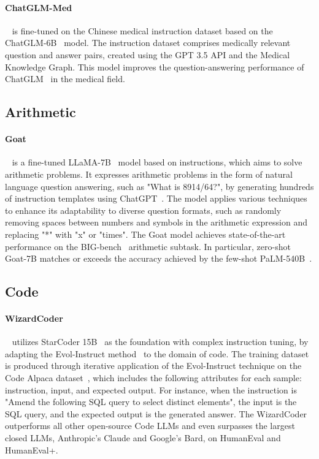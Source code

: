 \documentclass[11pt]{article}
\begin{document}
\paragraph{ChatGLM-Med}~\citep{ChatGLM-Med} is fine-tuned on the Chinese medical instruction dataset based on the ChatGLM-6B~\citep{du2022glm} model. The instruction dataset comprises medically relevant question and answer pairs, created using the GPT 3.5 API and the Medical Knowledge Graph. This model improves the question-answering performance of ChatGLM~\citep{du2022glm} in the medical field.

\subsection{Arithmetic}
\paragraph{Goat}~\citep{liu2023goat} is a fine-tuned LLaMA-7B~\citep{Touvron2023LLaMAOA} model based on instructions, which aims to solve arithmetic problems. It expresses arithmetic problems in the form of natural language question answering, such as "What is 8914/64?", by generating hundreds of instruction templates using ChatGPT~\citep{chatgpt}. The model applies various techniques to enhance its adaptability to diverse question formats, such as randomly removing spaces between numbers and symbols in the arithmetic expression and replacing "*" with "x" or "times". The Goat model achieves state-of-the-art performance on the BIG-bench~\citep{Srivastava2022BeyondTI} arithmetic subtask. In particular, zero-shot Goat-7B matches or exceeds the accuracy achieved by the few-shot PaLM-540B~\citep{Chowdhery2022PaLMSL}.

\subsection{Code}
\paragraph{WizardCoder}~\citep{luo2023wizardcoder} utilizes StarCoder 15B~\citep{li2023starcoder} as the foundation with complex instruction tuning, by adapting the Evol-Instruct method~\citep{xu2023wizardlm} to the domain of code. The training dataset is produced through iterative application of the Evol-Instruct technique on the Code Alpaca dataset~\citep{alpaca}, which includes the following attributes for each sample: instruction, input, and expected output. For instance, when the instruction is "Amend the following SQL query to select distinct elements", the input is the SQL query, and the expected output is the generated answer. The WizardCoder outperforms all other open-source Code LLMs and even surpasses the largest closed LLMs, Anthropic's Claude and Google's Bard, on HumanEval and HumanEval+.
\end{document}
